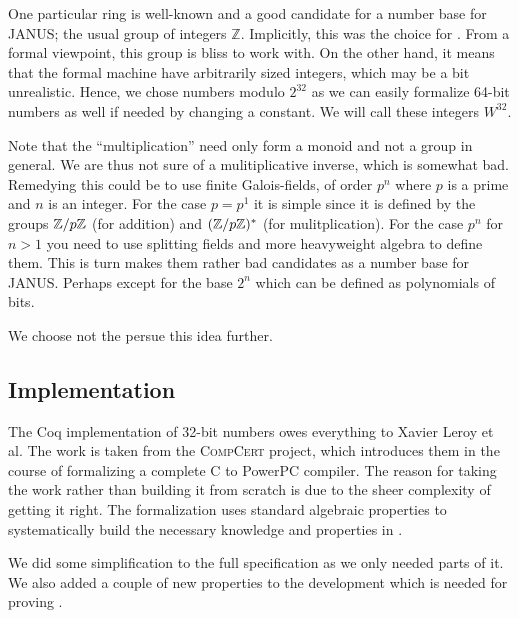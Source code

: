 One particular ring is well-known and a good candidate for a number
base for JANUS; the usual group of integers $\mathbb{Z}$. Implicitly,
this was the choice for \janusz{}. From a formal viewpoint, this group
is bliss to work with. On the other hand, it means that the formal
machine have arbitrarily sized integers, which may be a bit
unrealistic. Hence, we chose numbers modulo $2^{32}$ as we can easily
formalize 64-bit numbers as well if needed by changing a constant. We
will call these integers $W^{32}$.

\begin{rem}
  Note that the ``multiplication'' need only form a monoid and not a
  group in general. We are thus not sure of a mulitiplicative inverse,
  which is somewhat bad. Remedying this could be to use finite
  Galois-fields, of order $p^n$ where $p$ is a prime and
  $n$ is an integer. For the case $p = p^1$ it is simple since it is
  defined by the groups $\mathbb{Z} / p\mathbb{Z}$ (for addition) and $(\mathbb{Z} /
  p\mathbb{Z})^{*}$ (for mulitplication). For the case $p^n$ for $n > 1$ you
  need to use splitting fields and more heavyweight algebra to define
  them. This is turn makes them rather bad candidates as a number base
  for JANUS. Perhaps except for the base $2^n$ which can be defined as
  polynomials of bits.

  We choose not the persue this idea further.
\end{rem}

\subsection{\coq{} Implementation}

The Coq implementation of 32-bit numbers owes everything to Xavier
Leroy et al\cite{Leroy-Compcert-Coq}. The work is taken from the
\textsc{CompCert} project, which introduces them in the course of
formalizing a complete C to PowerPC compiler. The reason for taking
the work rather than building it from scratch is due to the sheer
complexity of getting it right. The formalization uses standard
algebraic properties to systematically build the necessary knowledge
and properties in \coq{}.

We did some simplification to the full specification as we only needed
parts of it. We also added a couple of new properties to the
development which is needed for proving \januso{}.

